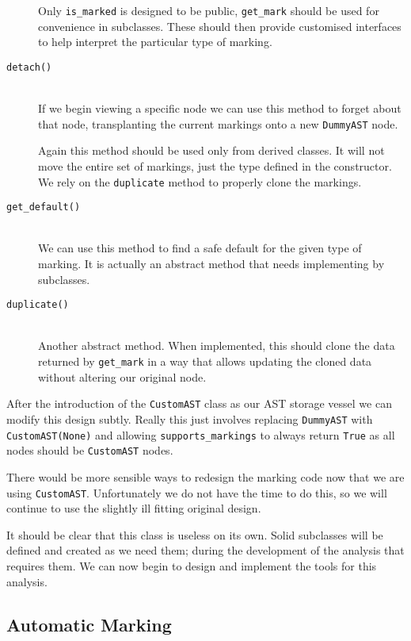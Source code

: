 \documentclass[twoside,a4paper]{report}
\begin{document}
\begin{description}
Only \texttt{is\_marked} is designed to be public, \texttt{get\_mark} should be used for convenience in subclasses. These should then provide
customised interfaces to help interpret the particular type of marking.

\item[\texttt{detach()}] \hfill \\
If we begin viewing a specific node we can use this method to forget about that node, transplanting the current markings onto a new
\texttt{DummyAST} node.

Again this method should be used only from derived classes. It will not move the entire set of markings, just the type defined
in the constructor. We rely on the \texttt{duplicate} method to properly clone the markings.

\item[\texttt{get\_default()}] \hfill \\
We can use this method to find a safe default for the given type of marking. It is actually an abstract method that needs implementing by
subclasses.

\item[\texttt{duplicate()}] \hfill \\
Another abstract method. When implemented, this should clone the data returned by \texttt{get\_mark} in a way that allows updating the
cloned data without altering our original node.

\end{description}

After the introduction of the \texttt{CustomAST} class as our AST storage vessel we can modify this design subtly. Really this just
involves replacing \texttt{DummyAST} with \texttt{CustomAST(None)} and allowing \texttt{supports\_markings} to always return
\texttt{True} as all nodes should be \texttt{CustomAST} nodes.

There would be more sensible ways to redesign the marking code now that we are using \texttt{CustomAST}. Unfortunately we do not have the
time to do this, so we will continue to use the slightly ill fitting original design.

It should be clear that this class is useless on its own. Solid subclasses will be defined and created as we need them; during the
development of the analysis that requires them. We can now begin to design and implement the tools for this analysis.

\subsection{Automatic Marking}
\end{document}
